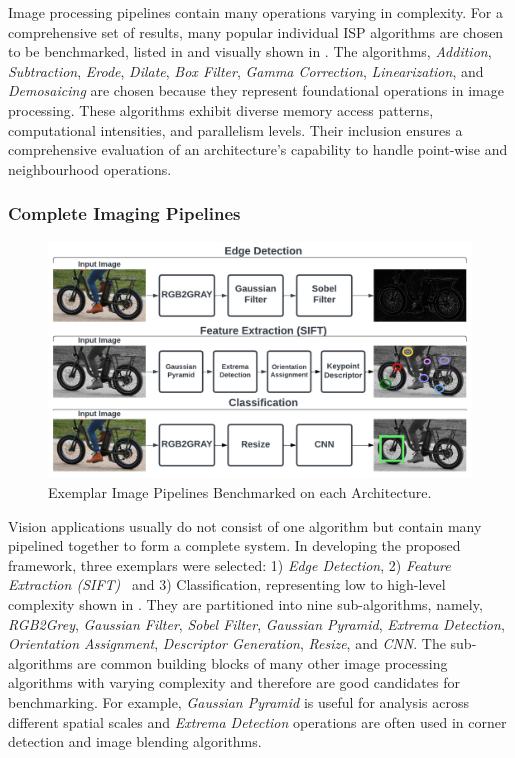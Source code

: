 
Image processing pipelines contain many operations varying in complexity. For a comprehensive set of results, many popular individual ISP algorithms are chosen to be benchmarked, listed in  and visually shown in . The algorithms, \textit{Addition},  \textit{Subtraction}, \textit{Erode}, \textit{Dilate}, \textit{Box Filter}, \textit{Gamma Correction}, \textit{Linearization}, and \textit{Demosaicing} are chosen because they represent foundational operations in image processing. These algorithms exhibit diverse memory access patterns, computational intensities, and parallelism levels. Their inclusion ensures a comprehensive evaluation of an architecture's capability to handle point-wise and neighbourhood operations.


\subsubsection{Complete Imaging Pipelines}
\begin{figure}[t]
\centering
  \includegraphics[width=\textwidth]{Images/PopularPipeline.png}
    \caption[Exemplar Image Pipelines]{Exemplar Image Pipelines Benchmarked on each Architecture. }
    \label{fig:completepipelines} 
\end{figure}

Vision applications usually do not consist of one algorithm but contain many pipelined together to form a complete system. In developing the proposed framework, three exemplars were selected: 1) \textit{Edge Detection}, 2) \textit{Feature Extraction (SIFT)}~\cite{Low99} and 3) Classification, representing low to high-level complexity shown in . They are partitioned into nine sub-algorithms, namely, \textit{RGB2Grey}, \textit{Gaussian Filter}, \textit{Sobel Filter},  \textit{Gaussian Pyramid}, \textit{Extrema Detection}, \textit{Orientation Assignment}, \textit{Descriptor Generation}, \textit{Resize}, and \textit{CNN}. The sub-algorithms are common building blocks of many other image processing algorithms with varying complexity and therefore are good candidates for benchmarking. For example, \textit{Gaussian Pyramid} is useful for analysis across different spatial scales and \textit{Extrema Detection} operations are often used in corner detection and image blending algorithms.

